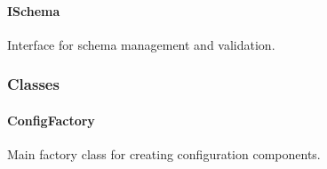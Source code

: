 \hypertarget{ischema-1}{%
\paragraph{ISchema}\label{ischema-1}}

Interface for schema management and validation.

\begin{Shaded}
\begin{Highlighting}[]
  \OperatorTok{:} \OperatorTok{,}\OperatorTok{:} \NormalTok{)}\OperatorTok{:} \OperatorTok{;}
  \OperatorTok{:}\OperatorTok{:} \OperatorTok{;}
  \OperatorTok{:} \NormalTok{)}\OperatorTok{:}\OperatorTok{|} \OperatorTok{;}
  \OperatorTok{:} \OperatorTok{,}\OperatorTok{:}\OperatorTok{:} \OperatorTok{;}
  \OperatorTok{:} \NormalTok{)}\OperatorTok{:} \OperatorTok{;}
  \OperatorTok{:} \NormalTok{)}\OperatorTok{:} \OperatorTok{;}
\NormalTok{\}}
\end{Highlighting}
\end{Shaded}

\hypertarget{classes-1}{%
\subsubsection{Classes}\label{classes-1}}

\hypertarget{configfactory-1}{%
\paragraph{ConfigFactory}\label{configfactory-1}}

Main factory class for creating configuration components.

